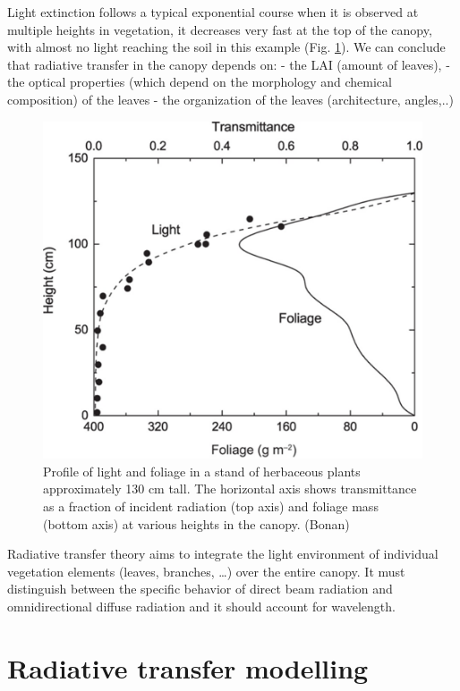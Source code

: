 \documentclass[12pt,oneside]{book}
\begin{document}
Light extinction follows a typical exponential course when it is
observed at multiple heights in vegetation, it decreases very fast at
the top of the canopy, with almost no light reaching the soil in this
example (Fig. \ref{fig:f36}). We can conclude that radiative transfer in
the canopy depends on: - the LAI (amount of leaves), - the optical
properties (which depend on the morphology and chemical composition) of
the leaves - the organization of the leaves (architecture, angles,..)

\begin{figure}

{\centering \includegraphics[width=0.8\linewidth]{figures/chap3/f36_obs_profile} 

}

\caption{Profile of light and foliage in a stand of herbaceous plants approximately 130 cm tall. The horizontal axis shows transmittance as a fraction of incident radiation (top axis) and foliage mass (bottom axis) at various heights in the canopy. (Bonan)}\label{fig:f36}
\end{figure}

Radiative transfer theory aims to integrate the light environment of
individual vegetation elements (leaves, branches, \ldots{}) over the
entire canopy. It must distinguish between the specific behavior of
direct beam radiation and omnidirectional diffuse radiation and it
should account for wavelength.

\section{Radiative transfer
modelling}\label{radiative-transfer-modelling}
\end{document}
